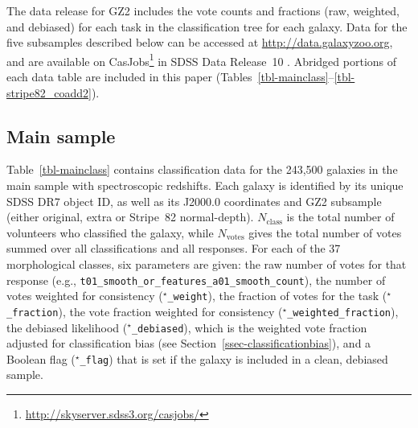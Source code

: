 \documentclass[useAMS,usenatbib]{mn2e}
\begin{document}
The data release for GZ2 includes the vote counts and fractions (raw, weighted, and debiased) for each task in the classification tree for each galaxy. Data for the five subsamples described below can be accessed at \url{http://data.galaxyzoo.org}, and are available on CasJobs\footnote{\url{http://skyserver.sdss3.org/casjobs/}} in SDSS Data Release~10 \citep{ahn13}. Abridged portions of each data table are included in this paper (Tables~\ref{tbl-mainclass}--\ref{tbl-stripe82_coadd2}).

\subsection{Main sample}\label{ssec-catalogue_main}

Table~\ref{tbl-mainclass} contains classification data for the 243,500 galaxies in the main sample with spectroscopic redshifts. Each galaxy is identified by its unique SDSS DR7 object ID, as well as its J2000.0 coordinates and GZ2 subsample (either original, extra or Stripe~82 normal-depth). $N_\mathrm{class}$ is the total number of volunteers who classified the galaxy, while $N_\mathrm{votes}$ gives the total number of votes summed over all classifications and all responses. For each of the 37 morphological classes, six parameters are given: the raw number of votes for that response (e.g., {\tt t01\_smooth\_or\_features\_a01\_smooth\_count}), the number of votes weighted for consistency ({\tt $^\star$\_weight}), the fraction of votes for the task ({\tt $^\star$\_fraction}), the vote fraction weighted for consistency ({\tt $^\star$\_weighted\_fraction}), the debiased likelihood ({\tt $^\star$\_debiased}), which is the weighted vote fraction adjusted for classification bias (see Section~\ref{ssec-classificationbias}), and a Boolean flag ({\tt $^\star$\_flag}) that is set if the galaxy is included in a clean, debiased sample.
\end{document}

